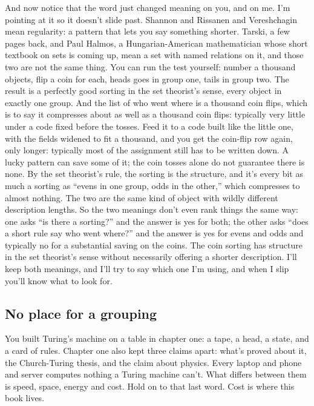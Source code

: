 \documentclass[11pt,twoside]{article}
\theoremstyle{thielethm}
\theoremstyle{thieledef}
\theoremstyle{thieledef}
\theoremstyle{thieledef}
\theoremstyle{thielethm}
\theoremstyle{thieleobs}
\theoremstyle{thielethm}
\begin{document}
And now notice that the word just changed meaning on you, and on me. I'm pointing at it so it doesn't slide past. Shannon and Rissanen and Vereshchagin mean regularity: a pattern that lets you say something shorter. Tarski, a few pages back, and Paul Halmos, a Hungarian-American mathematician whose short textbook on sets is coming up, mean a set with named relations on it, and those two are not the same thing. You can run the test yourself: number a thousand objects, flip a coin for each, heads goes in group one, tails in group two. The result is a perfectly good sorting in the set theorist's sense, every object in exactly one group. And the list of who went where is a thousand coin flips, which is to say it compresses about as well as a thousand coin flips: typically very little under a code fixed before the tosses. Feed it to a code built like the little one, with the fields widened to fit a thousand, and you get the coin-flip row again, only longer: typically most of the assignment still has to be written down. A lucky pattern can save some of it; the coin tosses alone do not guarantee there is none. By the set theorist's rule, the sorting is the structure, and it's every bit as much a sorting as ``evens in one group, odds in the other,'' which compresses to almost nothing. The two are the same kind of object with wildly different description lengths. So the two meanings don't even rank things the same way: one asks ``is there a sorting?'' and the answer is yes for both; the other asks ``does a short rule say who went where?'' and the answer is yes for evens and odds and typically no for a substantial saving on the coins. The coin sorting has structure in the set theorist's sense without necessarily offering a shorter description. I'll keep both meanings, and I'll try to say which one I'm using, and when I slip you'll know what to look for.

\subsection{No place for a grouping}

You built Turing's machine on a table in chapter one: a tape, a head, a state, and a card of rules. Chapter one also kept three claims apart: what's proved about it, the Church-Turing thesis, and the claim about physics. Every laptop and phone and server computes nothing a Turing machine can't. What differs between them is speed, space, energy and cost. Hold on to that last word. Cost is where this book lives.
\end{document}
